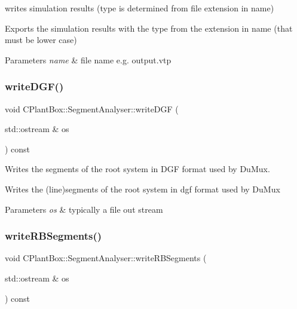 writes simulation results (type is determined from file extension in name) 

Exports the simulation results with the type from the extension in name (that must be lower case)


\begin{DoxyParams}{Parameters}
{\em name} & file name e.\+g. output.\+vtp \\
\hline
\end{DoxyParams}
\mbox{\label{classCPlantBox_1_1SegmentAnalyser_abda97405b2591f633f44ca5856befeab}} 
\subsubsection{\texorpdfstring{write\+D\+G\+F()}{writeDGF()}}
{\footnotesize\ttfamily void C\+Plant\+Box\+::\+Segment\+Analyser\+::write\+D\+GF (\begin{DoxyParamCaption}\item[{std\+::ostream \&}]{os }\end{DoxyParamCaption}) const}



Writes the segments of the root system in D\+GF format used by Du\+Mux. 

Writes the (line)segments of the root system in dgf format used by Du\+Mux


\begin{DoxyParams}{Parameters}
{\em os} & typically a file out stream \\
\hline
\end{DoxyParams}
\mbox{\label{classCPlantBox_1_1SegmentAnalyser_add6618a9caceaadc37b9e52deaa2bec6}} 
\subsubsection{\texorpdfstring{write\+R\+B\+Segments()}{writeRBSegments()}}
{\footnotesize\ttfamily void C\+Plant\+Box\+::\+Segment\+Analyser\+::write\+R\+B\+Segments (\begin{DoxyParamCaption}\item[{std\+::ostream \&}]{os }\end{DoxyParamCaption}) const}



